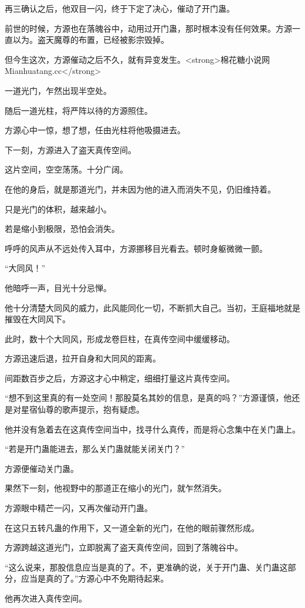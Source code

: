 \begin{this_body}
再三确认之后，他双目一闪，终于下定了决心，催动了开门蛊。

前世的时候，方源也在落魄谷中，动用过开门蛊，那时根本没有任何效果。方源一直以为。盗天魔尊的布置，已经被影宗毁掉。

但今生这次，方源催动之后不久，就有异变发生。<strong>棉花糖小说网Mianhuatang.cc</strong>

一道光门，乍然出现半空处。

随后一道光柱，将严阵以待的方源照住。

方源心中一惊，想了想，任由光柱将他吸摄进去。

下一刻，方源进入了盗天真传空间。

这片空间，空空荡荡。十分广阔。

在他的身后，就是那道光门，并未因为他的进入而消失不见，仍旧维持着。

只是光门的体积，越来越小。

若是缩小到极限，恐怕会消失。

呼呼的风声从不远处传入耳中，方源挪移目光看去。顿时身躯微微一颤。

“大同风！”

他暗呼一声，目光十分忌惮。

他十分清楚大同风的威力，此风能同化一切，不断抓大自己。当初，王庭福地就是摧毁在大同风下。

此时，数十个大同风，形成龙卷巨柱，在真传空间中缓缓移动。

方源迅速后退，拉开自身和大同风的距离。

间距数百步之后，方源这才心中稍定，细细打量这片真传空间。

“想不到这里真的有一处空间！那股莫名其妙的信息，是真的吗？”方源谨慎，他还是对星宿仙尊的歌声提示，抱有疑虑。

他并没有急着去在这真传空间当中，找寻什么真传，而是将心念集中在关门蛊上。

“若是开门蛊能进去，那么关门蛊就能关闭关门？”

方源便催动关门蛊。

果然下一刻，他视野中的那道正在缩小的光门，就乍然消失。

方源眼中精芒一闪，又再次催动开门蛊。

在这只五转凡蛊的作用下，又一道全新的光门，在他的眼前骤然形成。

方源跨越这道光门，立即脱离了盗天真传空间，回到了落魄谷中。

“这么说来，那股信息应当是真的了。不，更准确的说，关于开门蛊、关门蛊这部分，应当是真的了。”方源心中不免期待起来。

他再次进入真传空间。


\end{this_body}
